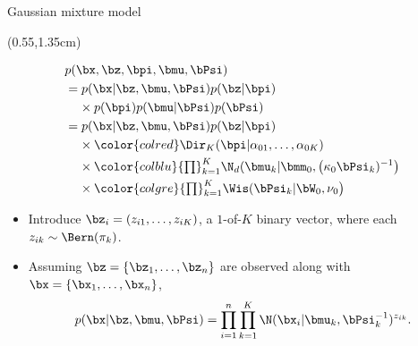\begin{frame}{Gaussian mixture model}
    \begin{textblock*}{0.47\textwidth}(0.55\textwidth,1.35cm)
    \begin{block}{}
    \vspace{-1.6em}
      \begin{align*}
        &p(\bx,\bz,\bpi,\bmu,\bPsi) \\
        &= p(\bx|\bz,\bmu,\bPsi)p(\bz|\bpi) \\
        &\phantom{ = } \ \times p(\bpi)p(\bmu|\bPsi)p(\bPsi) \\
        &= p(\bx|\bz,\bmu,\bPsi)p(\bz|\bpi) \\
        &\phantom{ = } \ \times {\color{colred} \Dir_K(\bpi|\alpha_{01},\dots,\alpha_{0K})} \\
        &\phantom{ = } \ \times {\color{colblu} {\textstyle\prod}_{k=1}^K \N_d(\bmu_k| \bmm_0, \big(\kappa_0\bPsi_k)^{-1}\big)} \\
        &\phantom{ = } \ \times {\color{colgre} {\textstyle\prod}_{k=1}^K \Wis(\bPsi_k| \bW_0,\nu_0\big)}      
      \end{align*}
    \end{block}
  \end{textblock*}

  \vspace{2mm}
  \begin{itemize}
    \item Introduce $\bz_i = (z_{i1},\dots,z_{iK})$, a $1$-of-$K$ binary vector, where each $z_{ik} \sim \Bern(\pi_k)$.
    \item Assuming $\bz = \{\bz_1,\dots,\bz_n \}$ are observed along with $\bx = \{\bx_1,\dots,\bx_n \}$,
    \[
      p(\bx|\bz,\bmu,\bPsi) = \prod_{i=1}^n \prod_{k=1}^K \N(\bx_i|\bmu_k,\bPsi_k^{-1})^{z_{ik}}.
    \]
  \end{itemize}
\end{frame}

